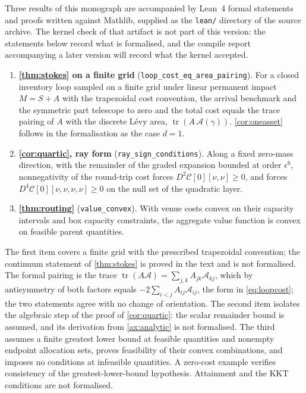 \documentclass[11pt]{article}
\numberwithin{equation}{section}
\theoremstyle{definition}
\theoremstyle{remark}
\newif\ifleanverified
\theoremstyle{definition}
\begin{document}
\ifleanverified
Three results of this monograph are formalised in Lean~4 against Mathlib and
checked by the Lean kernel. The artifact is the \texttt{lean/} directory of
the source archive, pinned to Lean~4.19.0 and Mathlib v4.19.0. The reported
axioms for each theorem are contained in the standard set
\{\texttt{propext}, \texttt{Classical.choice}, \texttt{Quot.sound}\};
the development contains no \texttt{sorry}. The build and axiom logs
are supplied with \texttt{lean/COMPILE.md}.
\else
Three results of this monograph are accompanied by Lean~4 formal statements
and proofs written against Mathlib, supplied as the \texttt{lean/} directory
of the source archive. The kernel check of that artifact is not part of this
version: the statements below record what is formalised, and the compile
report accompanying a later version will record what the kernel accepted.
\fi

\begin{enumerate}[leftmargin=*]
\item \textbf{\cref{thm:stokes} on a finite grid}
  (\texttt{loop\_cost\_eq\_area\_pairing}). For a closed inventory loop
  sampled on a finite grid under linear permanent impact $M=S+A$ with the
  trapezoidal cost convention, the arrival benchmark and the symmetric part
  telescope to zero and the total cost equals the trace pairing of $A$ with
  the discrete L\'evy area, $\operatorname{tr}(A\,\mathcal A(\gamma))$.
  \cref{cor:oneasset} follows in the formalisation as the case $d=1$.
\item \textbf{\cref{cor:quartic}, ray form}
  (\texttt{ray\_sign\_conditions}). Along a fixed zero-mass direction, with
  the remainder of the graded expansion bounded at order $\epsilon^6$,
  nonnegativity of the round-trip cost forces $D^2\mathcal C[0][\nu,\nu]\ge0$,
  and forces $D^4\mathcal C[0][\nu,\nu,\nu,\nu]\ge0$ on the null set of the
  quadratic layer.
\item \textbf{\cref{thm:routing}} (\texttt{value\_convex}). With
  venue costs convex on their capacity intervals and box capacity constraints,
  the aggregate value function is convex on feasible parent quantities.
\end{enumerate}

The first item covers a finite grid with the prescribed trapezoidal
convention; the continuum statement of \cref{thm:stokes} is proved in the
text and is not formalised. The formal pairing is the trace
$\operatorname{tr}(A\mathcal A)=\sum_{j,k}A_{jk}\mathcal A_{kj}$, which by
antisymmetry of both factors equals $-2\sum_{i<j}A_{ij}\mathcal A_{ij}$, the
form in \eqref{eq:loopcost}; the two statements agree with no change of
orientation. The second item isolates the algebraic step of the proof of
\cref{cor:quartic}: the scalar remainder bound is assumed, and its
derivation from \cref{ax:analytic} is not formalised. The third assumes a
finite greatest lower bound at feasible quantities and nonempty endpoint
allocation sets, proves feasibility of their convex combinations, and
imposes no conditions at infeasible quantities. A zero-cost example verifies
consistency of the greatest-lower-bound hypothesis. Attainment and the KKT
conditions are not formalised.
\end{document}

